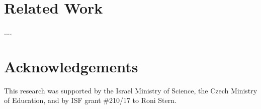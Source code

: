 \documentclass[letterpaper]{article} %
\begin{document}


\section{Related Work}
....




\section{Acknowledgements}
This research was supported by the Israel Ministry of Science, the Czech Ministry of Education, and by ISF grant \#210/17 to Roni Stern.

\clearpage


\end{document}
